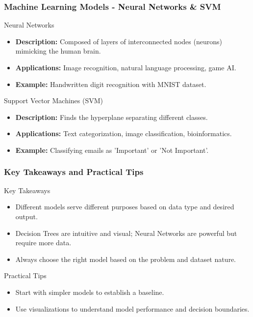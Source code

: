 \documentclass[aspectratio=169]{beamer}
\begin{document}
\begin{frame}[fragile]
  \frametitle{Machine Learning Models - Neural Networks & SVM}
  
  \begin{block}{Neural Networks}
    \begin{itemize}
      \item \textbf{Description:} Composed of layers of interconnected nodes (neurons) mimicking the human brain.
      \item \textbf{Applications:} Image recognition, natural language processing, game AI.
      \item \textbf{Example:} Handwritten digit recognition with MNIST dataset.
    \end{itemize}
  \end{block}

  \begin{block}{Support Vector Machines (SVM)}
    \begin{itemize}
      \item \textbf{Description:} Finds the hyperplane separating different classes.
      \item \textbf{Applications:} Text categorization, image classification, bioinformatics.
      \item \textbf{Example:} Classifying emails as 'Important' or 'Not Important'.
    \end{itemize}
  \end{block}
\end{frame}

\begin{frame}[fragile]
  \frametitle{Key Takeaways and Practical Tips}
  
  \begin{block}{Key Takeaways}
    \begin{itemize}
      \item Different models serve different purposes based on data type and desired output.
      \item Decision Trees are intuitive and visual; Neural Networks are powerful but require more data.
      \item Always choose the right model based on the problem and dataset nature.
    \end{itemize}
  \end{block}

  \begin{block}{Practical Tips}
    \begin{itemize}
      \item Start with simpler models to establish a baseline.
      \item Use visualizations to understand model performance and decision boundaries.
    \end{itemize}
  \end{block}
\end{frame}
\end{document}
